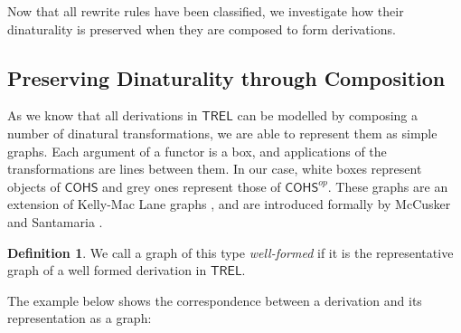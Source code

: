 \documentclass[11pt, oneside]{article}
\theoremstyle{plain}
\theoremstyle{definition}
\newtheorem{definition}[theorem]{Definition}
\newcommand{\sSys}{{\mathsf{TREL}}}%
\newcommand{\cohs}{{\mathsf{COHS}}}
\begin{document}
Now that all rewrite rules have been classified, we investigate how their dinaturality is preserved when they are composed to form derivations.

\subsection{Preserving Dinaturality through Composition}
As we know that all derivations in $\sSys$ can be modelled by composing a number of dinatural transformations, we are able to represent them as simple graphs.
Each argument of a functor is a box, and applications of the transformations are lines between them.
In our case, white boxes represent objects of $\cohs$ and grey ones represent those of $\cohs^{op}$.
These graphs are an extension of Kelly-Mac Lane graphs \cite{mac2013categories}, and are introduced formally by McCusker and Santamaria \cite{mccusker2018compositionality}.

\begin{definition}
We call a graph of this type \textit{well-formed} if it is the representative graph of a well formed derivation in $\sSys$.
\end{definition}

The example below shows the correspondence between a derivation and its representation as a graph:
\end{document}

